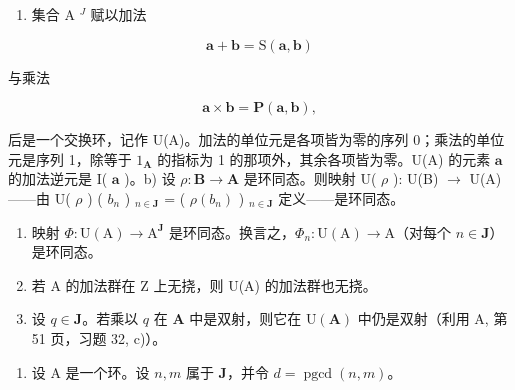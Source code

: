 \begin{enumerate}
\def\labelenumi{\alph{enumi})}
\tightlist
\item
  集合 A \(^{J}\) 赋以加法
\end{enumerate}

\[
\boldsymbol {a} + \boldsymbol {b} = \mathrm{S} (\boldsymbol {a}, \boldsymbol {b})
\]

与乘法

\[
\boldsymbol {a} \times \boldsymbol {b} = \mathbf {P} (\boldsymbol {a}, \boldsymbol {b}),
\]

后是一个交换环，记作 U(A)。加法的单位元是各项皆为零的序列 0；乘法的单位元是序列 1，除等于 \(1_{\mathbf{A}}\) 的指标为 1 的那项外，其余各项皆为零。U(A) 的元素 \(\boldsymbol{a}\) 的加法逆元是 I( \(\boldsymbol{a}\) )。b) 设 \(\rho: \mathbf{B} \to \mathbf{A}\) 是环同态。则映射 U( \(\rho\) ): U(B) \(\to\) U(A)——由 U( \(\rho\) ) ( \(b_n\) ) \(_{n \in \mathbf{J}}\) = ( \(\rho(b_n)\) ) \(_{n \in \mathbf{J}}\) 定义——是环同态。

\begin{enumerate}
\def\labelenumi{\alph{enumi})}
\setcounter{enumi}{2}
\item
  映射 \(\Phi: \mathrm{U}(\mathrm{A}) \to \mathrm{A}^{\mathbf{J}}\) 是环同态。换言之，\(\Phi_{n}: \mathrm{U}(\mathrm{A}) \to \mathrm{A}\)（对每个 \(n \in \mathbf{J}\)）是环同态。
\item
  若 A 的加法群在 Z 上无挠，则 U(A) 的加法群也无挠。
\item
  设 \(q \in \mathbf{J}\)。若乘以 \(q\) 在 \(\mathbf{A}\) 中是双射，则它在 \(\mathrm{U}(\mathbf{A})\) 中仍是双射（利用 A, 第 51 页，习题 32, c)）。
\end{enumerate}

\begin{enumerate}
\def\labelenumi{\arabic{enumi})}
\setcounter{enumi}{35}
\tightlist
\item
  设 A 是一个环。设 \(n, m\) 属于 \(\mathbf{J}\)，并令 \(d = \operatorname{pgcd}(n, m)\)。
\end{enumerate}

